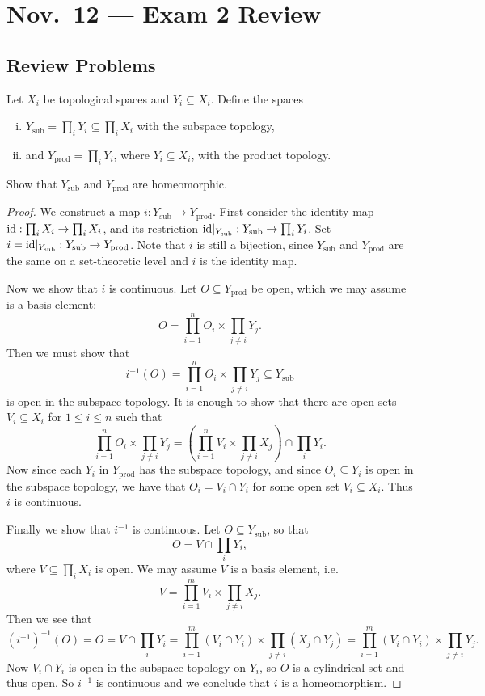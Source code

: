 \chapter{Nov.~12 --- Exam 2 Review}

\section{Review Problems}

\begin{exercise}
  Let $X_i$ be topological spaces
  and $Y_i \subseteq X_i$. Define the spaces
  \begin{enumerate}[(i)]
    \item $Y_{\text{sub}} = \prod_{i} Y_i \subseteq \prod_{i} X_i$ with the subspace topology,
    \item and $Y_{\text{prod}} = \prod_{i} Y_i$, where
      $Y_i \subseteq X_i$, with the product topology.
  \end{enumerate}
  Show that $Y_{\text{sub}}$ and $Y_{\text{prod}}$ are homeomorphic.
\end{exercise}

\begin{proof}
  We construct a map $i : Y_{\text{sub}} \to Y_{\text{prod}}$.
  First consider the identity map
  $\operatorname{id} : \prod_{i} X_i \to \prod_{i} X_i$, and
  its restriction ${\operatorname{id}}|_{Y_{\text{sub}}} : Y_{\text{sub}} \to \prod_{i} Y_i$.
  Set $i = {\operatorname{id}}|_{Y_{\text{sub}}} : Y_{\text{sub}} \to Y_{\text{prod}}$.
  Note that $i$ is still a bijection, since
  $Y_{\text{sub}}$ and $Y_{\text{prod}}$ are the
  same on a set-theoretic level and $i$ is the
  identity map.

  Now we show that $i$ is continuous. Let
  $O \subseteq Y_{\text{prod}}$ be open,
  which we may assume is a basis element:
  \[
    O = \prod_{i = 1}^n O_i \times \prod_{j \ne i} Y_j.
  \]
  Then we must show that
  \[
    i^{-1}(O) = \prod_{i = 1}^n O_i \times \prod_{j \ne i} Y_j \subseteq Y_{\text{sub}}
  \]
  is open in the subspace topology. It is enough to
  show that there are open sets
  $V_i \subseteq X_i$ for $1 \le i \le n$ such
  that
  \[
    \prod_{i = 1}^n O_i \times \prod_{j \ne i} Y_j =
    \left(\prod_{i = 1}^n V_i \times \prod_{j \ne i} X_j\right) \cap \prod_{i} Y_i.
  \]
  Now since each $Y_i$ in $Y_{\text{prod}}$ has
  the subspace topology,
  and since $O_i \subseteq Y_i$ is open in the
  subspace topology, we have that
  $O_i = V_i \cap Y_i$ for some open
  set $V_i \subseteq X_i$. Thus $i$ is continuous.

  Finally we show that $i^{-1}$ is continuous.
  Let $O \subseteq Y_{\text{sub}}$, so that
  \[
    O = V \cap \prod_{i} Y_i,
  \]
  where $V \subseteq \prod_{i} X_i$ is open.
  We may assume $V$ is a basis element, i.e.
  \[
    V = \prod_{i = 1}^m V_i \times \prod_{j \ne i} X_j.
  \]
  Then we see that
  \[
    (i^{-1})^{-1}(O) = O
    = V \cap \prod_{i} Y_i
    = \prod_{i = 1}^m (V_i \cap Y_i) \times \prod_{j \ne i} (X_j \cap Y_j)
    = \prod_{i = 1}^m (V_i \cap Y_i) \times \prod_{j \ne i} Y_j.
  \]
  Now $V_i \cap Y_i$ is open in the subspace
  topology on $Y_i$, so $O$ is a cylindrical set
  and thus open. So $i^{-1}$ is continuous and
  we conclude that $i$ is a homeomorphism.
\end{proof}

